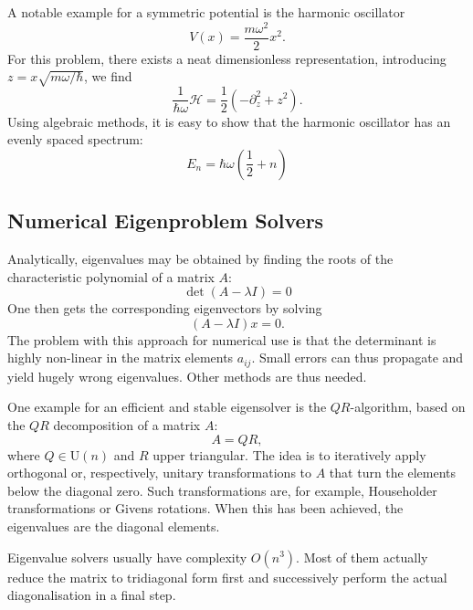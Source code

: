 \documentclass[a4paper,DIV=12,english]{scrartcl}
\begin{document}
A notable example for a symmetric potential is the harmonic oscillator
\begin{equation}
    V(x) = \frac{m\omega^2}{2} x^2.
\end{equation}
For this problem, there exists a neat dimensionless representation, introducing $z=x\sqrt{m\omega /\hbar}$, we find 
\begin{equation}
    \frac{1}{\hbar\omega}\mathcal{H} = \frac{1}{2}\left( -\partial_z^2 + z^2\right).
\end{equation}
Using algebraic methods, it is easy to show that the harmonic oscillator has an evenly spaced spectrum:
\begin{equation}
    E_n = \hbar\omega\left(\frac{1}{2} + n\right)
\end{equation}

\subsection{Numerical Eigenproblem Solvers}
Analytically, eigenvalues may be obtained by finding the roots of the characteristic polynomial of a matrix $A$:
\begin{equation}
    \det(A - \lambda I) = 0
\end{equation}
One then gets the corresponding eigenvectors by solving
\begin{equation}
    (A - \lambda I) x = 0.
\end{equation}
The problem with this approach for numerical use is that the determinant is highly non-linear in the matrix elements $a_{ij}$. Small errors can thus propagate and yield hugely wrong eigenvalues. Other methods are thus needed.

One example for an efficient and stable eigensolver is the $QR$-algorithm, based on the $QR$ decomposition of a matrix $A$:
\begin{equation}
    A = QR,
\end{equation}
where $Q\in \text{U}(n)$ and $R$ upper triangular. The idea is to iteratively apply orthogonal or, respectively, unitary transformations to $A$ that turn the elements below the diagonal zero. Such transformations are, for example, Householder transformations or Givens rotations. When this has been achieved, the eigenvalues are the diagonal elements.

Eigenvalue solvers usually have complexity $O(n^3)$\cite{numerik}. Most of them actually reduce the matrix to tridiagonal form first and successively perform the actual diagonalisation in a final step.
\end{document}
